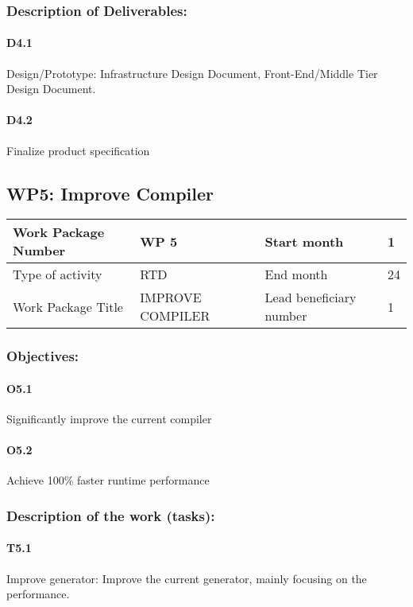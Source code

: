 \documentclass{article}
\begin{document}
\subsubsection{Description of Deliverables:}
\paragraph{D4.1} Design/Prototype: Infrastructure Design Document, Front-End/Middle Tier
Design Document. 
\paragraph{D4.2} Finalize product specification

\newpage

\subsection{WP5: Improve Compiler}
 
 \begin{center}
 	\begin{tabular}{ |p{3cm}|p{4cm}||p{2cm}|p{1cm}| }
 		\hline
 		Work Package Number & WP 5 & Start month & 1  \\ \hline
 		Type of activity & RTD & End month & 24 \\ \hline
 		Work Package Title & IMPROVE COMPILER & Lead beneficiary number & 1 \\ \hline
 	\end{tabular}
 \end{center}

\subsubsection{Objectives:}
\paragraph{O5.1} Significantly improve the current compiler
\paragraph{O5.2} Achieve 100\% faster runtime performance

\subsubsection{Description of the work (tasks):}
\paragraph{T5.1} Improve generator: Improve the current generator, mainly focusing on the performance.
\end{document}
